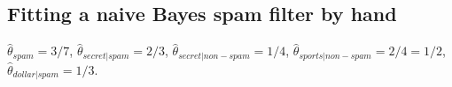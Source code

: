 \subsection{Fitting a naive Bayes spam filter by hand}
$\hat\theta_{spam} = 3/7$, $\hat\theta_{secret|spam} = 2/3$, $\hat\theta_{secret|non-spam} = 1/4$, $\hat\theta_{sports|non-spam} = 2/4 = 1/2$, $\hat\theta_{dollar|spam} = 1/3$.